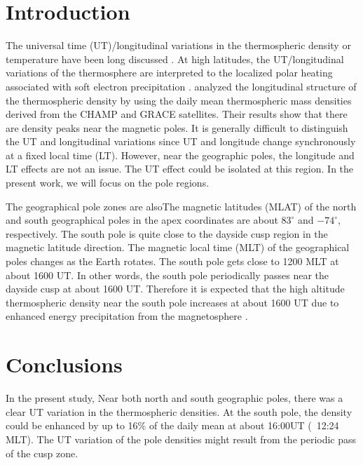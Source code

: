 \documentclass[draft,grl]{/home/gdj/文档/template/agu_template/AGUTeX}
\begin{document}
\begin{article}

\section{Introduction}
    The universal time (UT)/longitudinal variations in the thermospheric density or temperature have been long 
    discussed \citep[e.g.,][]{Hedin1972, Hedin1979, Hedin1985, Xu2013a, Xu2013}. At high latitudes, the UT/longitudinal
    variations of the thermosphere are interpreted to the localized polar heating associated with soft 
    electron precipitation \citep{Hedin1972}. \citet{Xu2013} analyzed the longitudinal structure of the thermospheric
    density by using the daily mean thermospheric mass densities derived from the CHAMP and GRACE satellites. Their 
    results show that there are density peaks near the magnetic poles. It is generally difficult to distinguish the UT and 
    longitudinal variations since UT and longitude change synchronously at a fixed local time (LT). However, near the 
    geographic poles, the longitude and LT effects are not an issue. The UT effect could be isolated at this region. In the
    present work, we will focus on the pole regions.

    The geographical pole zones are alsoThe magnetic latitudes (MLAT) of the north and south geographical poles in the apex coordinates are about $83^{\circ}$ 
    and $-74^{\circ}$, respectively. The south pole is quite close to the dayside cusp region in the magnetic latitude 
    direction. The magnetic local time (MLT) of the geographical poles changes as the Earth rotates. The south pole 
    gets close to 1200 MLT at about 1600 UT. In other words, the south pole periodically passes near the dayside cusp
    at about 1600 UT. Therefore it is expected that the high altitude thermospheric density near the south pole increases at
    about 1600 UT due to enhanced energy precipitation from the magnetosphere \citep[e.g.,][]{Luhr2004, Zhang2012, 
    Deng2013}. 

\section{Conclusions} 
    In the present study, Near both north and south geographic poles, there was a clear UT variation in the
    thermospheric densities. At the south pole, the density could be enhanced by up to 16\% of the daily mean
    at about 16:00UT (~12:24 MLT). The UT variation of the pole densities might result from the periodic pass 
    of the cusp zone.



\end{article}
\end{document}
